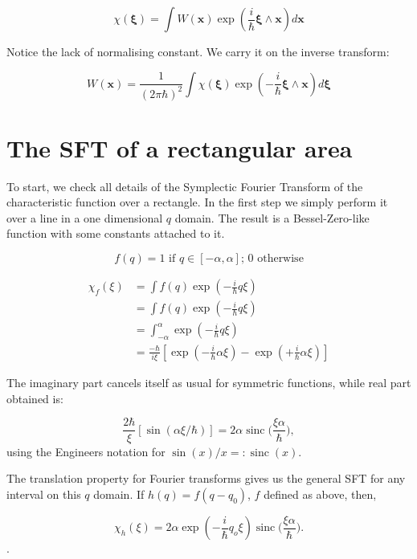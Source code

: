 \documentclass[a4paper,12pt]{article}
\newcommand{\ihb}{\frac{i}{\hbar}}
\newcommand{\xfase}{\mathbf{x}}
\newcommand{\xifase}{ {\boldsymbol{\xi}} }
\DeclareMathOperator*{\sinc}{sinc}
\begin{document}
\begin{equation}
\chi(\xifase)=\int W(\xfase) \exp (\ihb\xifase\wedge\xfase) d\xfase
\end{equation}

Notice the lack of normalising constant. We carry it on the inverse
transform:

\begin{equation}
W(\xfase)=\frac{1}{(2 \pi \hbar)^2}
\int \chi(\xifase) \exp (-\ihb\xifase\wedge\xfase) d\xifase
\end{equation}



\section{The SFT of a rectangular area}

To start, we check all details of the Symplectic Fourier Transform
of the characteristic function over a rectangle. In the first step
we simply perform it over a line in a one dimensional $q$ domain.
The result is a Bessel-Zero-like  function with some constants attached
to it. 

\begin{equation}
f(q)=1 \text { if } q\in [-\alpha, \alpha]\text{; }0 \text{ otherwise}
\end{equation}

\begin{align}
\chi_f(\xi) &= \int f(q) \exp (-\ihb q \xi ) \\
&= \int f(q) \exp (-\ihb q \xi ) \\ 
&= \int_{-\alpha}^{\alpha} \exp (-\ihb q \xi ) \\ 
&= \frac{-\hbar}{i\xi}
[\exp(-\ihb \alpha\xi )- \exp(+\ihb\alpha\xi)]  
\end{align}

The imaginary part cancels itself as usual for symmetric functions,
while real part obtained is:

\begin{equation}
\frac{2 \hbar}{\xi}[\sin(\alpha \xi/\hbar)]=
 2\alpha \sinc \Big( \frac{\xi\alpha}{\hbar} \Big),
\end{equation}
using the Engineers notation for $\sin(x)/x=: \sinc (x)$.

The translation property for Fourier transforms gives us 
the general SFT for any interval on this $q$ domain.
If $h(q)=f(q-q_0)$, $f$ defined as above, then,

\begin{equation}
\chi_h (\xi)=2 \alpha \exp (-\ihb q_o \xi)
\sinc\Big( \frac{\xi\alpha}{\hbar} \Big).
\end{equation}.
\end{document}
